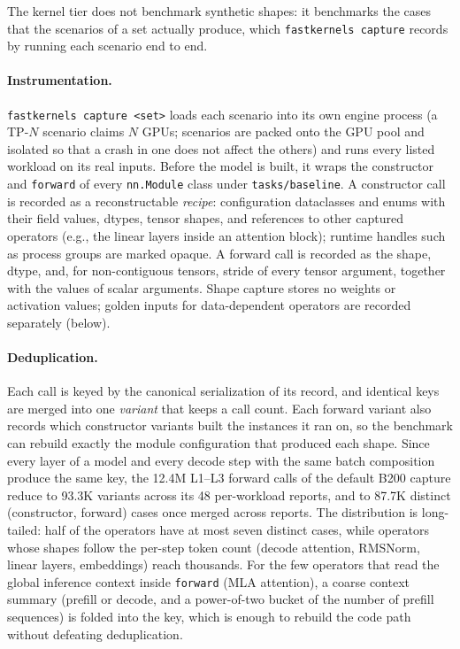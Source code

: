 The kernel tier does not benchmark synthetic shapes: it benchmarks the cases that the scenarios of a set actually produce, which \texttt{fastkernels capture} records by running each scenario end to end.

\paragraph{Instrumentation.}
\texttt{fastkernels capture <set>} loads each scenario into its own engine process (a TP-$N$ scenario claims $N$ GPUs; scenarios are packed onto the GPU pool and isolated so that a crash in one does not affect the others) and runs every listed workload on its real inputs.
Before the model is built, it wraps the constructor and \texttt{forward} of every \texttt{nn.Module} class under \texttt{tasks/baseline}.
A constructor call is recorded as a reconstructable \emph{recipe}: configuration dataclasses and enums with their field values, dtypes, tensor shapes, and references to other captured operators (e.g., the linear layers inside an attention block); runtime handles such as process groups are marked opaque.
A forward call is recorded as the shape, dtype, and, for non-contiguous tensors, stride of every tensor argument, together with the values of scalar arguments.
Shape capture stores no weights or activation values; golden inputs for data-dependent operators are recorded separately (below).

\paragraph{Deduplication.}
Each call is keyed by the canonical serialization of its record, and identical keys are merged into one \emph{variant} that keeps a call count.
Each forward variant also records which constructor variants built the instances it ran on, so the benchmark can rebuild exactly the module configuration that produced each shape.
Since every layer of a model and every decode step with the same batch composition produce the same key, the 12.4M L1--L3 forward calls of the default B200 capture reduce to 93.3K variants across its 48 per-workload reports, and to 87.7K distinct (constructor, forward) cases once merged across reports.
The distribution is long-tailed: half of the operators have at most seven distinct cases, while operators whose shapes follow the per-step token count (decode attention, RMSNorm, linear layers, embeddings) reach thousands.
For the few operators that read the global inference context inside \texttt{forward} (MLA attention), a coarse context summary (prefill or decode, and a power-of-two bucket of the number of prefill sequences) is folded into the key, which is enough to rebuild the code path without defeating deduplication.


